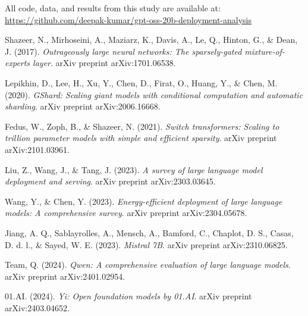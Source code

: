 \documentclass[11pt]{article}
\begin{document}
All code, data, and results from this study are available at: \url{https://github.com/deepak-kumar/gpt-oss-20b-deployment-analysis}


\begin{thebibliography}{9}

Shazeer, N., Mirhoseini, A., Maziarz, K., Davis, A., Le, Q., Hinton, G., \& Dean, J. (2017).
\textit{Outrageously large neural networks: The sparsely-gated mixture-of-experts layer}.
arXiv preprint arXiv:1701.06538.

Lepikhin, D., Lee, H., Xu, Y., Chen, D., Firat, O., Huang, Y., \& Chen, M. (2020).
\textit{GShard: Scaling giant models with conditional computation and automatic sharding}.
arXiv preprint arXiv:2006.16668.

Fedus, W., Zoph, B., \& Shazeer, N. (2021).
\textit{Switch transformers: Scaling to trillion parameter models with simple and efficient sparsity}.
arXiv preprint arXiv:2101.03961.

Liu, Z., Wang, J., \& Tang, J. (2023).
\textit{A survey of large language model deployment and serving}.
arXiv preprint arXiv:2303.03645.

Wang, Y., \& Chen, Y. (2023).
\textit{Energy-efficient deployment of large language models: A comprehensive survey}.
arXiv preprint arXiv:2304.05678.

Jiang, A. Q., Sablayrolles, A., Mensch, A., Bamford, C., Chaplot, D. S., Casas, D. d. l., \& Sayed, W. E. (2023).
\textit{Mistral 7B}.
arXiv preprint arXiv:2310.06825.

Team, Q. (2024).
\textit{Qwen: A comprehensive evaluation of large language models}.
arXiv preprint arXiv:2401.02954.

01.AI. (2024).
\textit{Yi: Open foundation models by 01.AI}.
arXiv preprint arXiv:2403.04652.

\end{thebibliography}
\end{document}
